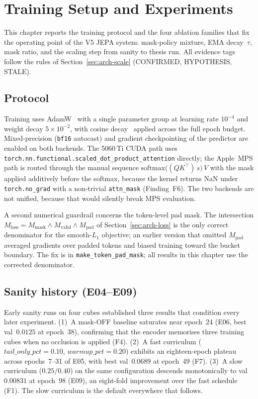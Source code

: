 \chapter{Training Setup and Experiments}
\label{ch:experiments}

This chapter reports the training protocol and the four ablation
families that fix the operating point of the V5 JEPA system:
mask-policy mixture, EMA decay~$\tau$, mask ratio, and the scaling
step from sanity to thesis run. All evidence tags follow the rules
of Section~\ref{sec:arch-scale} (CONFIRMED, HYPOTHESIS, STALE).

\section{Protocol}
\label{sec:exp-protocol}

Training uses AdamW~\cite{loshchilov2019adamw} with a single
parameter group at learning rate $10^{-4}$ and weight decay
$5 \times 10^{-2}$, with cosine decay~\cite{loshchilov2017sgdr}
applied across the full epoch budget. Mixed-precision (\texttt{bf16}
autocast) and gradient checkpointing of the predictor are enabled on
both backends. The 5060\,Ti CUDA path uses
\texttt{torch.nn.functional.scaled\_dot\_product\_attention} directly;
the Apple~MPS path is routed through the manual sequence
$\mathrm{softmax}\!\bigl((QK^{\top})\,s\bigr)\,V$ with the mask
applied additively before the softmax, because the kernel returns
NaN under \texttt{torch.no\_grad} with a non-trivial
\texttt{attn\_mask} (Finding~F6). The two backends are not unified, because that would
silently break MPS evaluation.

A second numerical guardrail concerns the token-level pad mask. The
intersection $M_{\text{loss}} = M_{\text{mask}} \land M_{\text{valid}}
\land M_{\text{pad}}$ of Section~\ref{sec:arch-loss} is the only
correct denominator for the smooth-$L_{1}$ objective; an earlier
version that omitted $M_{\text{pad}}$ averaged gradients over padded
tokens and biased training toward the bucket boundary. The fix is in
\texttt{make\_token\_pad\_mask}; all results in this chapter use the
corrected denominator.

\section{Sanity history (E04--E09)}
\label{sec:exp-sanity}

Early sanity runs on four cubes established three results that
condition every later experiment. (1)~A mask-OFF baseline saturates
near epoch~24 (E06, best val~$0.0125$ at epoch~38), confirming that
the encoder memorises three training cubes when no occlusion is
applied (F4). (2)~A fast curriculum
($\mathit{tail\_only\_pct}{=}0.10$, $\mathit{warmup\_pct}{=}0.20$)
exhibits an eighteen-epoch plateau across epochs~7--31 of E05, with
best val~$0.0689$ at epoch~49 (F7). (3)~A slow curriculum
($0.25/0.40$) on the same configuration descends monotonically to
val~$0.00831$ at epoch~98 (E09), an eight-fold improvement over the
fast schedule (F1). The slow curriculum is the default everywhere
that follows.

